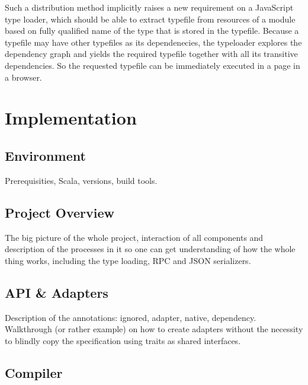 \documentclass[12pt,a4paper]{report}
\begin{document}
Such a distribution method implicitly raises a new requirement on a JavaScript type loader, which should be able to extract typefile from resources of a module based on fully qualified name of the type that is stored in the typefile. Because a typefile may have other typefiles as its dependenecies, the typeloader explores the dependency graph and yields the required typefile together with all its transitive dependencies. So the requested typefile can be immediately executed in a page in a browser.








\chapter{Implementation}

\section{Environment}

Prerequisities, Scala, versions, build tools.

\section{Project Overview}

The big picture of the whole project, interaction of all components and description of the processes in it so one can get understanding of how the whole thing works, including the type loading, RPC and JSON serializers.

\section{API \& Adapters}

Description of the annotations: ignored, adapter, native, dependency. Walkthrough (or rather example) on how to create adapters without the necessity to blindly copy the specification using traits as shared interfaces.

\section{Compiler}
\end{document}
